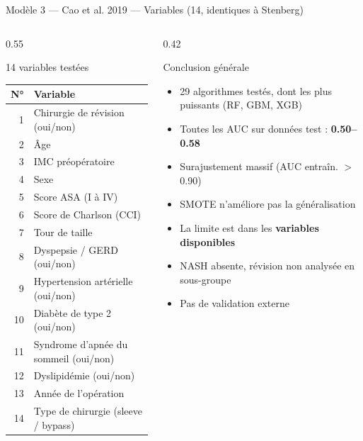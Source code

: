 \documentclass[aspectratio=169]{beamer}
\newcommand{\tightlist}{%
  \setlength{\itemsep}{1pt}\setlength{\parskip}{0pt}%
  \setlength{\parsep}{0pt}\setlength{\topsep}{2pt}}
\begin{document}
\begin{frame}[shrink=5]{Modèle 3 --- Cao et al. 2019 --- Variables (14, identiques à Stenberg)}
  \begin{columns}[T]
    \begin{column}{0.55\textwidth}
      \begin{block}{14 variables testées}
        \footnotesize
        \begin{tabular}{rl}
          \toprule
          \textbf{N°} & \textbf{Variable} \\
          \midrule
          1  & Chirurgie de révision (oui/non) \\
          2  & Âge \\
          3  & IMC préopératoire \\
          4  & Sexe \\
          5  & Score ASA (I à IV) \\
          6  & Score de Charlson (CCI) \\
          7  & Tour de taille \\
          8  & Dyspepsie / GERD (oui/non) \\
          9  & Hypertension artérielle (oui/non) \\
          10 & Diabète de type 2 (oui/non) \\
          11 & Syndrome d'apnée du sommeil (oui/non) \\
          12 & Dyslipidémie (oui/non) \\
          13 & Année de l'opération \\
          14 & Type de chirurgie (sleeve / bypass) \\
          \bottomrule
        \end{tabular}
      \end{block}
    \end{column}
    \begin{column}{0.42\textwidth}
      \begin{alertblock}{Conclusion générale}
        \footnotesize\tightlist
        \begin{itemize}\tightlist
          \item 29 algorithmes testés, dont les plus puissants (RF, GBM, XGB)
          \item Toutes les AUC sur données test : \textbf{0.50--0.58}
          \item Surajustement massif (AUC entraîn. $>$0.90)
          \item SMOTE n'améliore pas la généralisation
          \item La limite est dans les \textbf{variables disponibles}
          \item NASH absente, révision non analysée en sous-groupe
          \item Pas de validation externe
        \end{itemize}
      \end{alertblock}
    \end{column}
  \end{columns}
\end{frame}
\end{document}
